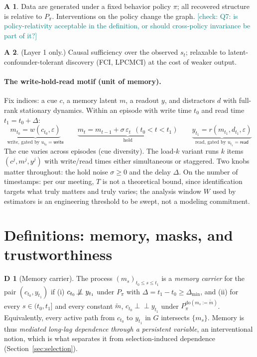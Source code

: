 \documentclass[11pt]{article}
\newcommand{\indep}{\perp\!\!\!\perp}
\newcommand{\nindep}{\not\!\perp\!\!\!\perp}
\newcommand{\Do}{\mathrm{do}}
\newcommand{\checkY}[1]{\textcolor{teal}{\footnotesize [check: #1]}}
\theoremstyle{plain}
\theoremstyle{definition}
\newtheorem{assumption}{A}
\newtheorem{definitionx}{D}
\begin{document}
\begin{assumption}\label{a:policy}
Data are generated under a fixed behavior policy $\pi$; all recovered structure is relative to $P_\pi$. Interventions on the policy change the graph. \checkY{Q7: is policy-relativity acceptable in the definition, or should cross-policy invariance be part of it?}
\end{assumption}

\begin{assumption}\label{a:suff}
(Layer 1 only.) Causal sufficiency over the observed $s_t$; relaxable to latent-confounder-tolerant discovery (FCI, LPCMCI) at the cost of weaker output.
\end{assumption}

\paragraph{The write-hold-read motif (unit of memory).}
Fix indices: a cue $c$, a memory latent $m$, a readout $y$, and distractors $d$ with full-rank stationary dynamics. Within an episode with write time $t_0$ and read time $t_1 = t_0 + \Delta$:
\[
\underbrace{m_{t_0} = w(c_{t_0}, \varepsilon)}_{\text{write, gated by } u_{t_0} = \mathsf{write}}
\qquad
\underbrace{m_t = m_{t-1} + \sigma\,\varepsilon_t \ \ (t_0 < t < t_1)}_{\text{hold}}
\qquad
\underbrace{y_{t_1} = r(m_{t_1}, d_{t_1}, \varepsilon)}_{\text{read, gated by } u_{t_1} = \mathsf{read}}
\]
The cue varies across episodes (cue diversity). The load-$k$ variant runs $k$ items $(c^j, m^j, y^j)$ with write/read times either simultaneous or staggered. Two knobs matter throughout: the hold noise $\sigma \ge 0$ and the delay $\Delta$. On the number of timestamps: per our meeting, $T$ is not a theoretical bound, since identification targets what truly matters and truly varies; the analysis window $W$ used by estimators is an engineering threshold to be swept, not a modeling commitment.

\section{Definitions: memory, masks, and trustworthiness}\label{sec:defs}

\begin{definitionx}[Memory carrier]\label{def:carrier}
The process $(m_s)_{t_0 \le s \le t_1}$ is a \emph{memory carrier} for the pair $(c_{t_0}, y_{t_1})$ if
(i) $c_{t_0} \nindep y_{t_1}$ under $P_\pi$ with $\Delta = t_1 - t_0 \ge \Delta_{\min}$, and
(ii) for every $s \in (t_0, t_1]$ and every constant $\tilde m$, $c_{t_0} \indep y_{t_1}$ under $P_\pi^{\Do(m_s := \tilde m)}$.
Equivalently, every active path from $c_{t_0}$ to $y_{t_1}$ in $G$ intersects $\{m_s\}$. Memory is thus \emph{mediated long-lag dependence through a persistent variable}, an interventional notion, which is what separates it from selection-induced dependence (Section~\ref{sec:selection}).
\end{definitionx}
\end{document}

